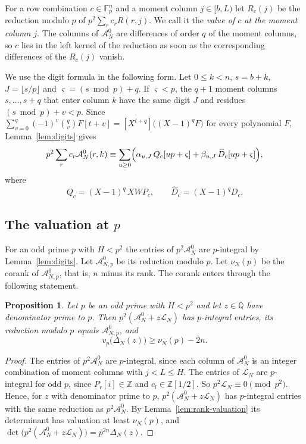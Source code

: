 \documentclass[11pt]{amsart}
\newtheorem{proposition}[theorem]{Proposition}
\theoremstyle{definition}
\theoremstyle{remark}
\numberwithin{equation}{section}
\newcommand{\Z}{\mathbb Z}
\newcommand{\Q}{\mathbb Q}
\newcommand{\F}{\mathbb F}
\newcommand{\cA}{\mathcal A}
\newcommand{\cL}{\mathcal L}
\begin{document}
For a row combination $c\in\F_p^n$ and a moment column $j\in[b,L)$ let $R_c(j)$ be the reduction modulo
$p$ of $p^2\sum_rc_rR(r,j)$. We call it the \emph{value of $c$ at the moment column $j$}. The columns of
$\cA^0_N$ are differences of order $q$ of the moment columns, so $c$ lies in the left kernel of the
reduction as soon as the corresponding differences of the $R_c(j)$ vanish.

We use the digit formula in the following form. Let $0\le k<n$, $s=b+k$, $J=\lfloor s/p\rfloor$ and
$\varsigma=(s\bmod p)+q$. If $\varsigma<p$, the $q+1$ moment columns $s,\dots,s+q$ that enter column $k$ have
the same digit $J$ and residues $(s\bmod p)+v<p$. Since
$\sum_{v=0}^q(-1)^v\binom qvF[t+v]=[X^{t+q}]\bigl((X-1)^qF\bigr)$ for every polynomial $F$,
Lemma~\ref{lem:digits} gives
\begin{equation}\label{eq:column-digits}
 p^2\sum_rc_r\cA^0_N(r,k)\equiv\sum_{u\ge0}\Bigl(\alpha_{u,J}\,Q_c[up+\varsigma]+\beta_{u,J}\,\widehat D_c[up+\varsigma]\Bigr),
\end{equation}
where
\begin{equation}\label{eq:Qc}
 Q_c=(X-1)^q\,XWP_c,\qquad \widehat D_c=(X-1)^qD_c .
\end{equation}

\subsection{The valuation at $p$}
For an odd prime $p$ with $H<p^2$ the entries of $p^2\cA^0_N$ are $p$-integral by Lemma~\ref{lem:digits}.
Let $\cA^0_{N,p}$ be its reduction modulo $p$. Let $\nu_N(p)$ be the corank of $\cA^0_{N,p}$, that is, $n$
minus its rank. The corank enters through the following statement.

\begin{proposition}\label{prop:valuation}
Let $p$ be an odd prime with $H<p^2$ and let $z\in\Q$ have denominator prime to $p$. Then
$p^2(\cA^0_N+z\cL_N)$ has $p$-integral entries, its reduction modulo $p$ equals $\cA^0_{N,p}$, and
\[
 v_p\bigl(\Delta_N(z)\bigr)\ge\nu_N(p)-2n .
\]
\end{proposition}

\begin{proof}
The entries of $p^2\cA^0_N$ are $p$-integral, since each column of $\cA^0_N$ is an integer combination of
moment columns with $j<L\le H$. The entries of $\cL_N$ are $p$-integral for odd $p$, since $P_r[i]\in\Z$
and $c_l\in\Z[1/2]$. So $p^2\cL_N\equiv0\pmod{p^2}$. Hence, for $z$ with denominator prime to $p$,
$p^2(\cA^0_N+z\cL_N)$ has $p$-integral entries with the same reduction as $p^2\cA^0_N$. By
Lemma~\ref{lem:rank-valuation} its determinant has valuation at least $\nu_N(p)$, and
$\det\bigl(p^2(\cA^0_N+z\cL_N)\bigr)=p^{2n}\Delta_N(z)$.
\end{proof}
\end{document}
